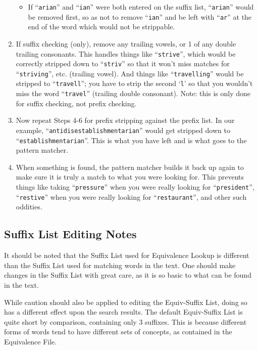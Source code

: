 \begin{enumerate}
\begin{itemize}
\item If ``\verb`arian`'' and ``\verb`ian`'' were both entered on the
suffix list, ``\verb`arian`'' would be removed first, so as not to
remove ``\verb`ian`'' and be left with ``\verb`ar`'' at the end of the
word which would not be strippable.
\end{itemize}

\item If suffix checking (only), remove any trailing vowels, or 1 of
any double trailing consonants.  This handles things like
``\verb`strive`'', which would be correctly stripped down to
``\verb`striv`'' so that it won't miss matches for
``\verb`striving`'', etc.  (trailing vowel).  And things like
``\verb`travelling`'' would be stripped to ``\verb`travell`''; you
have to strip the second `\verb`l`' so that you wouldn't miss the word
``\verb`travel`'' (trailing double consonant).  Note:  this is only
done for suffix checking, not prefix checking.

\item Now repeat Steps 4-6 for prefix stripping against the prefix
list.  In our example, ``\verb`antidisestablishmentarian`'' would get
stripped down to ``\verb`establishmentarian`''.  This is what you have
left and is what goes to the pattern matcher.

\item When something is found, the pattern matcher builds it back up
again to make sure it is truly a match to what you were looking for.
This prevents things like taking ``\verb`pressure`'' when you were
really looking for ``\verb`president`'', ``\verb`restive`'' when you
were really looking for ``\verb`restaurant`'', and other such
oddities.
\end{enumerate}

\subsection{Suffix List Editing Notes}

It should be noted that the Suffix List used for Equivalence Lookup is
different than the Suffix List used for matching words in the text.
One should make changes in the Suffix List with great care, as it is
so basic to what can be found in the text.

While caution should also be applied to editing the Equiv-Suffix List,
doing so has a different effect upon the search results.  The default
Equiv-Suffix List is quite short by comparison, containing only 3
suffixes.  This is because different forms of words tend to have
different sets of concepts, as contained in the Equivalence File.

